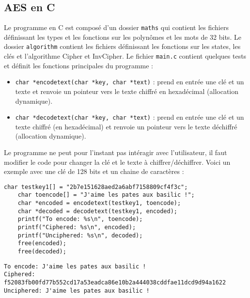 \documentclass[12pt]{article}
\begin{document}
\subsection{AES en C}
Le programme en C est composé d'un dossier \texttt{maths} qui contient les fichiers définissant les types et les fonctions sur les polynômes et les mots de 32 bits. Le dossier \texttt{algorithm} contient les fichiers définissant les fonctions sur les states, les clés et l'algorithme Cipher et InvCipher. Le fichier \texttt{main.c} contient quelques tests et définit les fonctions principales du programme :
\begin{itemize} 
    \item \texttt{char *encodetext(char *key, char *text)} : prend en entrée une clé et un texte et renvoie un pointeur vers le texte chiffré en hexadécimal (allocation dynamique).
    \item \texttt{char *decodetext(char *key, char *text)} : prend en entrée une clé et un texte chiffré (en hexadécimal) et renvoie un pointeur vers le texte déchiffré (allocation dynamique).
\end{itemize}
Le programme ne peut pour l'instant pas intéragir avec l'utilisateur, il faut modifier le code pour changer la clé et le texte à chiffrer/déchiffrer. Voici un exemple avec une clé de 128 bits et un chaine de caractères :
\begin{lstlisting}[caption=Contenu de la fonction \texttt{main},style=CStyle]
    char testkey1[] = "2b7e151628aed2a6abf7158809cf4f3c";
    char toencode[] = "J'aime les pates aux basilic !";
    char *encoded = encodetext(testkey1, toencode);
    char *decoded = decodetext(testkey1, encoded);
    printf("To encode: %s\n", toencode);
    printf("Ciphered: %s\n", encoded);
    printf("Unciphered: %s\n", decoded);
    free(encoded);
    free(decoded);
\end{lstlisting}
\begin{lstlisting}[caption=Résultat de l'exécution du programme \texttt{aes.out},style=CStyleL]
To encode: J'aime les pates aux basilic !
Ciphered: f52083fb00fd77b552cd17a53eadca86e10b2a444038cddfae11dcd9d94a1622
Unciphered: J'aime les pates aux basilic !
\end{lstlisting}
\end{document}
